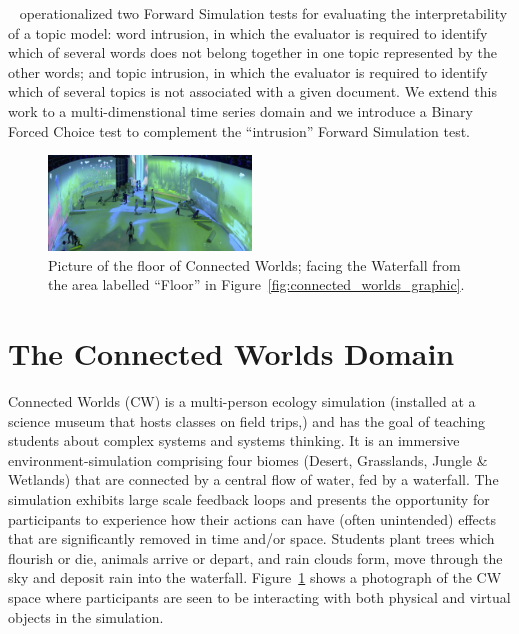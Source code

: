 \documentclass[letterpaper]{article} %
\newcommand{\citename}[1]{\citeauthor{#1}~\shortcite{#1}}
\begin{document}
\citename{chang2009reading} operationalized two Forward Simulation tests for evaluating the interpretability of a topic model: word intrusion, in which the evaluator is required to identify which of several words does not belong together in one topic represented by the other words; and  topic intrusion, in which the evaluator is required to
identify which of several topics is not associated with a given document.
We extend this work
to a multi-dimenstional time series domain and we introduce a Binary Forced Choice test to complement the ``intrusion'' Forward Simulation test.
















\begin{figure}[t]
\centering
\includegraphics[width=0.48\textwidth]{./images/cw_viz2.png}
\caption{Picture of the floor of Connected Worlds; facing the Waterfall from the area labelled ``Floor'' in Figure~\ref{fig:connected_worlds_graphic}.}
\label{fig:connected_worlds_viz}
\end{figure}


\section{The Connected Worlds Domain}
\label{sec:cw_desc}
Connected Worlds (CW) is a multi-person ecology simulation (installed at a science museum that hosts classes on field trips,) and has the goal of teaching students about complex systems and systems thinking.
It is an immersive environment-simulation comprising four biomes (Desert, Grasslands, Jungle \& Wetlands) that are connected by a central flow of water, fed by a waterfall. The simulation exhibits large scale feedback loops and presents the opportunity for participants to experience how their actions can have (often unintended) effects that are significantly removed in time and/or space. Students plant trees which flourish or die, animals arrive or depart, and rain clouds form, move through the sky and deposit rain into the waterfall.
Figure~\ref{fig:connected_worlds_viz} shows a photograph of the CW space where participants are seen to be interacting with both physical and virtual objects in the simulation.
\end{document}
